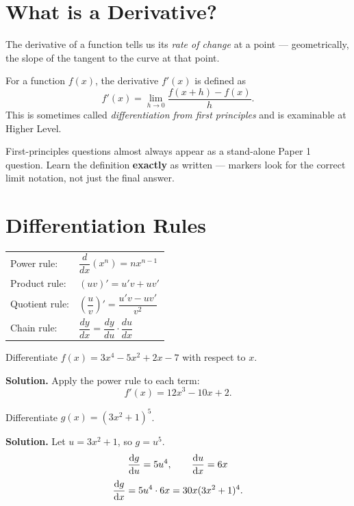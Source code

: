 \documentclass[11pt]{article}
\begin{document}
\ldmtitlepage

\tableofcontents
\clearpage

\section{What is a Derivative?}

The derivative of a function tells us its \emph{rate of change} at a
point --- geometrically, the slope of the tangent to the curve at that
point.

\begin{ldmdefinition}
For a function $f(x)$, the derivative $f'(x)$ is defined as
\[
  f'(x) = \lim_{h \to 0} \frac{f(x+h) - f(x)}{h}.
\]
This is sometimes called \emph{differentiation from first principles}
and is examinable at Higher Level.
\end{ldmdefinition}

\begin{ldmexamtip}
First-principles questions almost always appear as a stand-alone
Paper 1 question. Learn the definition \textbf{exactly} as written ---
markers look for the correct limit notation, not just the final answer.
\end{ldmexamtip}

\section{Differentiation Rules}

\begin{ldmformula}
  \begin{tabular}{ll}
    Power rule: & $\dfrac{d}{dx}\left(x^n\right) = nx^{n-1}$ \\[10pt]
    Product rule: & $(uv)' = u'v + uv'$ \\[10pt]
    Quotient rule: & $\left(\dfrac{u}{v}\right)' = \dfrac{u'v - uv'}{v^2}$ \\[10pt]
    Chain rule: & $\dfrac{dy}{dx} = \dfrac{dy}{du}\cdot\dfrac{du}{dx}$
  \end{tabular}
\end{ldmformula}

\begin{ldmexample}
Differentiate $f(x) = 3x^4 - 5x^2 + 2x - 7$ with respect to $x$.

\textbf{Solution.} Apply the power rule to each term:
\[
  f'(x) = 12x^3 - 10x + 2.
\]
\end{ldmexample}

\begin{ldmexample}
Differentiate $g(x) = (3x^2 + 1)^5$.

\textbf{Solution.} Let $u = 3x^2 + 1$, so $g = u^5$.
\[
  \dv{g}{u} = 5u^4, \qquad \dv{u}{x} = 6x
\]
\[
  \dv{g}{x} = 5u^4 \cdot 6x = 30x(3x^2+1)^4.
\]
\end{ldmexample}
\end{document}
